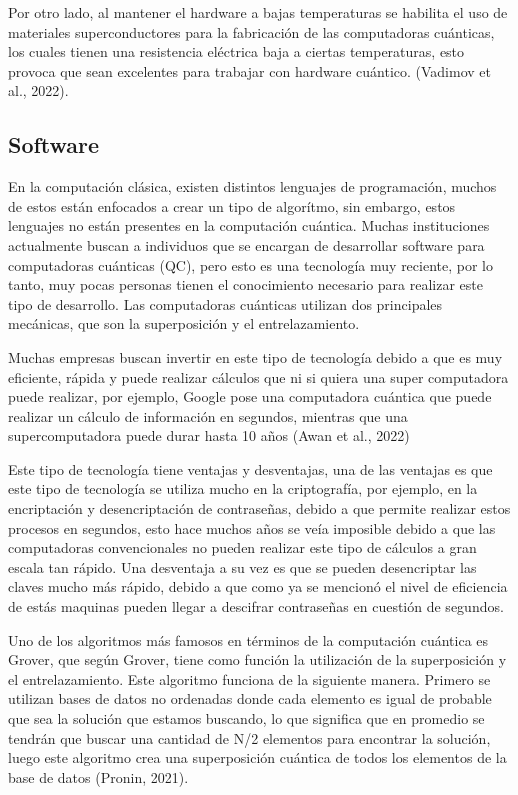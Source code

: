 \documentclass{article}
\begin{document}
Por otro lado, al mantener el hardware a bajas temperaturas se habilita el uso de materiales superconductores para la fabricación de las computadoras cuánticas, los cuales tienen una resistencia eléctrica baja a ciertas temperaturas, esto provoca que sean excelentes para trabajar con hardware cuántico. (Vadimov et al., 2022).


\subsection{Software}
En la computación clásica, existen distintos lenguajes de programación, muchos de estos están enfocados a crear un tipo de algorítmo, sin embargo, estos lenguajes no están presentes en la computación cuántica. Muchas instituciones actualmente buscan a individuos que se encargan de desarrollar software para computadoras cuánticas (QC), pero esto es una tecnología muy reciente, por lo tanto, muy pocas personas tienen el conocimiento necesario para realizar este tipo de desarrollo. Las computadoras cuánticas utilizan dos principales mecánicas, que son la superposición y el entrelazamiento. 

Muchas empresas buscan invertir en este tipo de tecnología debido a que es muy eficiente, rápida y puede realizar cálculos que ni si quiera una super computadora puede realizar, por ejemplo, Google pose una computadora cuántica que puede realizar un cálculo de información en segundos, mientras que una supercomputadora puede durar hasta 10 años (Awan et al., 2022)

Este tipo de tecnología tiene ventajas y desventajas, una de las ventajas es que este tipo de tecnología se utiliza mucho en la criptografía, por ejemplo, en la encriptación y desencriptación de contraseñas, debido a que permite realizar estos procesos en segundos, esto hace muchos años se veía imposible debido a que las computadoras convencionales no pueden realizar este tipo de cálculos a gran escala tan rápido. Una desventaja a su vez es que se pueden desencriptar las claves mucho más rápido, debido a que como ya se mencionó el nivel de eficiencia de estás maquinas pueden llegar a descifrar contraseñas en cuestión de segundos. 

Uno de los algoritmos más famosos en términos de la computación cuántica es Grover, que según Grover, tiene como función la utilización de la superposición y el entrelazamiento. Este algoritmo funciona de la siguiente manera. Primero se utilizan bases de datos no ordenadas donde cada elemento es igual de probable que sea la solución que estamos buscando, lo que significa que en promedio se tendrán que buscar una cantidad de N/2 elementos para encontrar la solución, luego este algoritmo crea una superposición cuántica de todos los elementos de la base de datos (Pronin, 2021).
\end{document}
